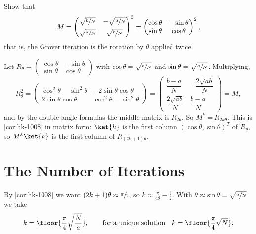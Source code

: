 \begin{exercisebox}
\begin{exercise}\label{ex:msquare-1008}
    Show that
    \[M = \begin{pmatrix} \sqrt{\sfrac{b}{N}} & -\sqrt{\sfrac{a}{N}} \\[1ex] \sqrt{\sfrac{a}{N}} & \sqrt{\sfrac{b}{N}} \end{pmatrix}^{2}
        = \begin{pmatrix} \cos\theta & -\sin\theta \\ \sin\theta & \cos\theta \end{pmatrix}^{2},\]
    that is, the Grover iteration is the rotation by $\theta$ applied twice.
\end{exercise}
\tcblower
\begin{wsolution}
    Let $R_\theta = \left(\begin{smallmatrix} \cos\theta & -\sin\theta \\ \sin\theta & \cos\theta \end{smallmatrix}\right)$
    with $\cos\theta = \sqrt{\sfrac{b}{N}}$ and $\sin\theta = \sqrt{\sfrac{a}{N}}$. Multiplying,
    \[R_\theta^2
        = \begin{pmatrix} \cos^2\theta - \sin^2\theta & -2\sin\theta\cos\theta \\ 2\sin\theta\cos\theta & \cos^2\theta - \sin^2\theta \end{pmatrix}
        = \begin{pmatrix} \dfrac{b - a}{N} & -\dfrac{2\sqrt{ab}}{N} \\[2ex] \dfrac{2\sqrt{ab}}{N} & \dfrac{b - a}{N} \end{pmatrix} = M,\]
    and by the double angle formulas the middle matrix is $R_{2\theta}$. So $M^k = R_{2k\theta}$.
    This is \cref{cor:hk-1008} in matrix form: $\ket{h}$ is the first column
    $(\cos\theta, \sin\theta)^T$ of $R_\theta$, so $M^k\ket{h}$ is the first column of $R_{(2k+1)\theta}$.
\end{wsolution}
\end{exercisebox}

\section{The Number of Iterations}\label{sec:iterations-1008}

By \cref{cor:hk-1008} we want $(2k+1)\theta \approx \sfrac{\pi}{2}$, so
$k \approx \frac{\pi}{4\theta} - \frac{1}{2}$. With $\theta \approx \sin\theta = \sqrt{\sfrac{a}{N}}$
we take
\[k = \floor{\frac{\pi}{4}\sqrt{\frac{N}{a}}}, \qquad \text{for a unique solution} \quad k = \floor{\frac{\pi}{4}\sqrt{N}}.\]

